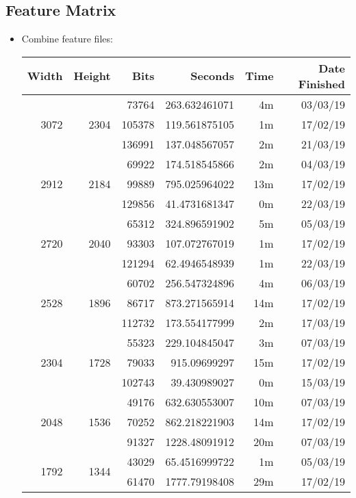 \subsection{Feature Matrix}
\begin{itemize}
  \item Combine feature files:
  \begin{center}
  \begin{tabular}{ r r r | r r r }
  Width & Height & Bits & Seconds & Time & Date Finished \\ \hline
  \multirow{3}{*}{3072} & \multirow{3}{*}{2304} & 73764 & 263.632461071 & 4m & 03/03/19 \\
  & & 105378 & 119.561875105 & 1m & 17/02/19 \\
  & & 136991 & 137.048567057 & 2m & 21/03/19 \\
  \hline
  \multirow{3}{*}{2912} & \multirow{3}{*}{2184} & 69922 & 174.518545866 & 2m & 04/03/19 \\
  & & 99889 & 795.025964022 & 13m & 17/02/19 \\
  & & 129856 & 41.4731681347 & 0m & 22/03/19 \\
  \hline
  \multirow{3}{*}{2720} & \multirow{3}{*}{2040} & 65312 & 324.896591902 & 5m & 05/03/19 \\
  & & 93303 & 107.072767019 & 1m & 17/02/19 \\
  & & 121294 & 62.4946548939 & 1m & 22/03/19 \\
  \hline
  \multirow{3}{*}{2528} & \multirow{3}{*}{1896} & 60702 & 256.547324896 & 4m & 06/03/19 \\
  & & 86717 & 873.271565914 & 14m & 17/02/19 \\
  & & 112732 & 173.554177999 & 2m & 17/03/19 \\
  \hline
  \multirow{3}{*}{2304} & \multirow{3}{*}{1728} & 55323 & 229.104845047 & 3m & 07/03/19 \\
  & & 79033 & 915.09699297 & 15m & 17/02/19 \\
  & & 102743 & 39.430989027 & 0m & 15/03/19 \\
  \hline
  \multirow{3}{*}{2048} & \multirow{3}{*}{1536} & 49176 & 632.630553007 & 10m & 07/03/19 \\
  & & 70252 & 862.218221903 & 14m & 17/02/19 \\
  & & 91327 & 1228.48091912 & 20m & 07/03/19 \\
  \hline
  \multirow{3}{*}{1792} & \multirow{3}{*}{1344} & 43029 & 65.4516999722 & 1m & 05/03/19 \\
  & & 61470 & 1777.79198408 & 29m & 17/02/19 \\

\end{tabular}
\end{center}
\end{itemize}
